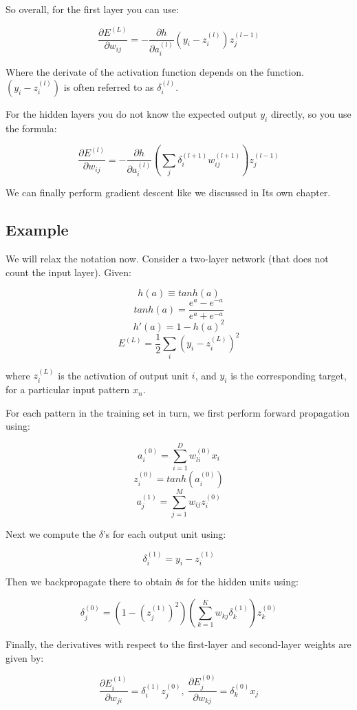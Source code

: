 \documentclass{article}
\begin{document}
So overall, for the first layer you can use:

\[\frac{\partial E^{(L)}}{\partial w_{ij}}=-\frac{\partial h}{\partial a_i^{(l)}}(y_i-z_i^{(l)})z_j^{(l-1)}\]

Where the derivate of the activation function depends on the function.
\((y_i-z_i^{(l)})\) is often referred to as \(\delta_i^{(l)}\).

For the hidden layers you do not know the expected output \(y_i\)
directly, so you use the formula:

\[\frac{\partial E^{(l)}}{\partial w_{ij}}=-\frac{\partial h}{\partial a_i^{(l)}}(\sum_j\delta^{(l+1)}_iw_{ij}^{(l+1)}) z_j^{(l-1)}\]

We can finally perform gradient descent like we discussed in Its own
chapter.

\subsection{Example}\label{example-1}

We will relax the notation now. Consider a two-layer network (that does
not count the input layer). Given:

\[h(a)\equiv tanh(a)\] \[tanh(a)=\frac{e^a-e^{-a}}{e^a+e^{-a}}\]
\[h'(a)=1-h(a)^2\] \[E^{(L)} = \frac{1}{2}\sum_{i} (y_i - z_i^{(L)})^2\]

where \(z_i^{(L)}\) is the activation of output unit \(i\), and \(y_i\)
is the corresponding target, for a particular input pattern \(x_n\).

For each pattern in the training set in turn, we first perform forward
propagation using:

\[a_i^{(0)} = \sum_{i=1}^D w_{li}^{(0)}x_i\]
\[z_i^{(0)} = tanh(a_i^{(0)})\]
\[a_j^{(1)} = \sum_{j=1}^M w_{ij}z_i^{(0)}\]

Next we compute the \(\delta\)'s for each output unit using:

\[\delta _i^{(1)} = y_i - z_i^{(1)}\]

Then we backpropagate there to obtain \(\delta\)s for the hidden units
using:

\[\delta_j^{(0)} = (1-(z_j^{(1)})^2)(\sum_{k=1}^K w_{kj}\delta_k^{(1)})z_k^{(0)}\]

Finally, the derivatives with respect to the first-layer and
second-layer weights are given by:

\[\frac{\partial E_i^{(1)}}{\partial w_{ji}}=\delta_i^{(1)}z_j^{(0)},\ \frac{\partial E_j^{(0)}}{\partial w_{kj}}=\delta _k^{(0)}x_j\]
\end{document}
